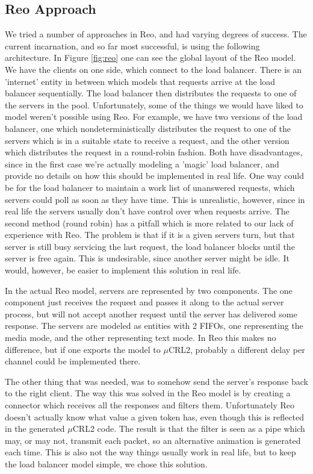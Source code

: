 \documentclass[a4paper]{article}
\newcommand{\re}{Reo\xspace}
\newcommand{\mcrl}{$\mu$CRL2\xspace}
\begin{document}
\subsection{\re Approach}

We tried a number of approaches in \re, and had varying degrees of success. The
current incarnation, and so far most successful, is using the following
architecture. In Figure \ref{fig:reo} one can see the global layout of the \re
model. We have the clients on one side, which connect to the load balancer.
There is an 'internet' entity in between which models that requests arrive at
the load balancer sequentially. The load balancer then distributes the requests
to one of the servers in the pool. Unfortunately, some of the things we would
have liked to model weren't possible using \re. For example, we have two
versions of the load balancer, one which nondeterministically distributes the
request to one of the servers which is in a suitable state to receive a request,
and the other version which distributes the request in a round-robin fashion.
Both have disadvantages, since in the first case we're actually modeling a
'magic' load balancer, and provide no details on how this should be implemented
in real life. One way could be for the load balancer to maintain a work list of
unanswered requests, which servers could poll as soon as they have time. This is
unrealistic, however, since in real life the servers usually don't have control
over when requests arrive. The second method (round robin) has a pitfall which
is more related to our lack of experience with \re. The problem is that if it is a
given servers turn, but that server is still busy servicing the last request,
the load balancer blocks until the server is free again. This is undesirable,
since another server might be idle. It would, however, be easier to implement
this solution in real life.

In the actual \re model, servers are represented by two components. The one
component just receives the request and passes it along to the actual server
process, but will not accept another request until the server has delivered some
response. The servers are modeled as entities with 2 FIFOs, one representing
the media mode, and the other representing text mode. In \re this makes no
difference, but if one exports the model to \mcrl, probably a different delay
per channel could be
implemented there.

The other thing that was needed, was to somehow send the server's response back
to the right client. The way this was solved in the \re model is by creating a
connector which receives all the responses and filters them. Unfortunately \re
doesn't actually know what value a given token has, even though this is
reflected in the generated \mcrl code. The result is that the filter is seen as
a pipe which may, or may not, transmit each packet, so an alternative animation
is generated each time. This is also not the way things usually work in real
life, but to keep the load balancer model simple, we chose this solution.
\end{document}
